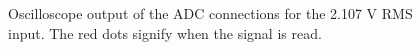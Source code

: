 \begin{figure}[ht]
    \centering
    \caption[Oscilloscope measurements for ADC]
            {Oscilloscope output of the ADC connections for the 2.107 V RMS input. The red dots signify when the signal is read.}
            \label{fig:scope_adc}
\end{figure}
